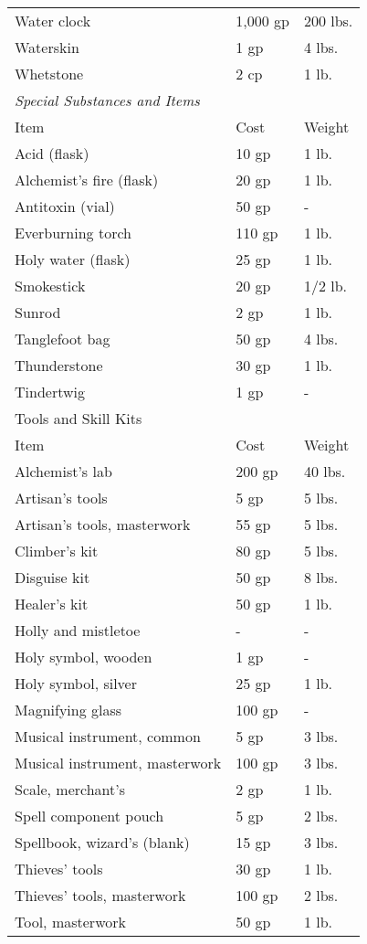 \begin{xtabular}{lll}
 Water clock & 1,000 gp & 200 lbs. \\
 Waterskin & 1 gp & 4 lbs. \\
 Whetstone & 2 cp & 1 lb.\\
\textit{Special Substances and Items} \\
Item & Cost & Weight\\
Acid (flask) & 10 gp & 1 lb. \\
 Alchemist's fire (flask) & 20 gp & 1 lb. \\
 Antitoxin (vial) & 50 gp & - \\
 Everburning torch & 110 gp & 1 lb. \\
 Holy water (flask) & 25 gp & 1 lb. \\
 Smokestick & 20 gp & 1/2 lb. \\
 Sunrod & 2 gp & 1 lb. \\
 Tanglefoot bag & 50 gp & 4 lbs. \\
 Thunderstone & 30 gp & 1 lb. \\
 Tindertwig & 1 gp & -\\
Tools and Skill Kits  \\
 Item & Cost & Weight\\
Alchemist's lab & 200 gp & 40 lbs. \\
 Artisan's tools & 5 gp & 5 lbs. \\
 Artisan's tools, masterwork & 55 gp & 5 lbs. \\
 Climber's kit & 80 gp & 5 lbs. \\
 Disguise kit & 50 gp & 8 lbs. \\
 Healer's kit & 50 gp & 1 lb. \\
 Holly and mistletoe & - & - \\
 Holy symbol, wooden & 1 gp & - \\
 Holy symbol, silver & 25 gp & 1 lb. \\
 Magnifying glass & 100 gp & - \\
 Musical instrument, common & 5 gp & 3 lbs. \\
 Musical instrument, masterwork & 100 gp & 3 lbs. \\
 Scale, merchant's & 2 gp & 1 lb. \\
 Spell component pouch & 5 gp & 2 lbs. \\
 Spellbook, wizard's (blank) & 15 gp & 3 lbs. \\
 Thieves' tools & 30 gp & 1 lb. \\
 Thieves' tools, masterwork & 100 gp & 2 lbs. \\
 Tool, masterwork & 50 gp & 1 lb.\\

\end{xtabular}
